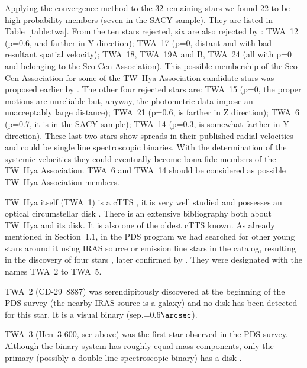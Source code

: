 \documentclass[11pt,twoside]{book}
\begin{document}
Applying the convergence method to the 32 remaining stars we found 22
to be high probability members (seven in the SACY sample).  They are
listed in Table~\ref{table:twa}.  From the ten stars rejected, six are
also rejected by \citet{mamajek05}: TWA~12 (p=0.6, and farther in Y
direction); TWA~17 (p=0, distant and with bad resultant spatial
velocity); TWA~18, TWA~19A and B, TWA~24 (all with p=0 and belonging
to the Sco-Cen Association).  This possible membership of the Sco-Cen
Association for some of the TW~Hya Association candidate stars was
proposed earlier by \citet{mamajekasp}.  The other four rejected stars
are: TWA~15 (p=0, the proper motions are unreliable but, anyway, the
photometric data impose an unacceptably large distance); TWA~21
(p=0.6, is farther in Z direction); TWA~6 (p=0.7, it is in the SACY
sample); TWA~14 (p=0.3, is somewhat farther in Y direction).  These
last two stars show spreads in their published radial velocities and
could be single line spectroscopic binaries.  With the determination
of the systemic velocities they could eventually become bona fide
members of the TW~Hya Association.  TWA~6 and TWA~14 should be
considered as possible TW~Hya Association members.

TW~Hya itself (TWA~1) is a cTTS \citep{RucinskiKrautter1983}, it is
very well studied and possesses an optical circumstellar disk
\citep{krist00}.  There is an extensive bibliography both about TW~Hya
and its disk.
It is also one of the oldest cTTS known.  As already mentioned in
Section~1.1, in the PDS program we had searched for other young stars
around it using IRAS source or emission line stars in the \citet{SW72}
catalog, resulting in the discovery of four stars \citep{delareza89,
gregorio92}, later confirmed by \citet{Kastner97}.  They were
designated with the names TWA~2 to TWA~5.

TWA~2 (CD-29~8887) was serendipitously discovered \citep{delareza89}
at the beginning of the PDS survey (the nearby IRAS source is a
galaxy) and no disk has been detected for this star.  It is a visual
binary (sep.=0.6$\arcsec$).

TWA~3 (Hen~3-600, see above) was the first star observed in the PDS survey.
Although the binary system has roughly equal mass components, only the primary
(possibly a double line spectroscopic binary)  has a disk \citep{ray99}.
\end{document}
